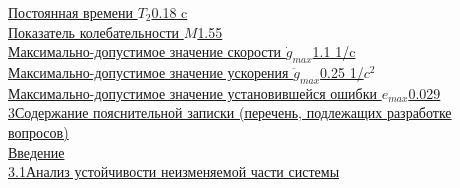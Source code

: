 \documentclass[fleqn, a4paper, 12pt, russian]{article}
\begin{document}
	{\fontsize{14pt}{0cm}\selectfont \underline{Постоянная времени $T_2$\hspace{10.1cm}0.18 c\hspace{0.4cm}}} \\ \vspace{0.2cm}
	{\fontsize{14pt}{0cm}\selectfont \underline{Показатель колебательности $M$\hspace{8.4cm}1.55\hspace{0.6cm}}} \\ \vspace{0.2cm}
	{\fontsize{14pt}{0cm}\selectfont \underline{Максимально-допустимое значение скорости $\dot{g}_{max}$\hspace{4.15cm}1.1 1/c\hspace{0.3cm}}} \\ \vspace{0.2cm}
	{\fontsize{14pt}{0cm}\selectfont \underline{Максимально-допустимое значение ускорения $\ddot{g}_{max}$\hspace{3.6cm}0.25 1/$c^2$\hspace{0.2cm}}} \\ \vspace{0.2cm}
	{\fontsize{14pt}{0cm}\selectfont \underline{Максимально-допустимое значение установившейся ошибки $e_{max}$\hspace{1cm}0.029\hspace{0.4cm}}} \\ \vspace{0.2cm}
	\newpage
	{\fontsize{14pt}{0cm}\selectfont \underline{3\hspace{0.5cm}Содержание пояснительной записки (перечень, подлежащих разработке\hspace{0.2cm}}\\\underline{\hspace{0.8cm}вопросов)\hspace{14cm}}} \\ \vspace{0.2cm}
	{\fontsize{14pt}{0cm}\selectfont \underline{\hspace{1.8cm}Введение\hspace{13.15cm}}} \\ \vspace{0.2cm}
	{\fontsize{14pt}{0cm}\selectfont \underline{\hspace{0.8cm}3.1\hspace{0.36cm}Анализ устойчивости неизменяемой части системы \hspace{3.65cm}}} \\ \vspace{0.2cm}
\end{document}
